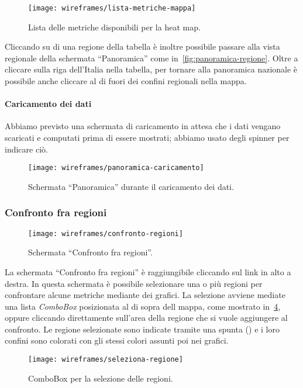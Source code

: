 \begin{figure}[H]
    \centering
    \texttt{[image: wireframes/lista-metriche-mappa]}
    \caption{Lista delle metriche disponibili per la heat map.}\label{fig:lista-metriche-mappa}
\end{figure}

Cliccando su di una regione della tabella è inoltre possibile passare alla vista regionale della schermata ``Panoramica'' come in~\ref{fig:panoramica-regione}. Oltre a cliccare sulla riga dell'Italia nella tabella, per tornare alla panoramica nazionale è possibile anche cliccare al di fuori dei confini regionali nella mappa.

\paragraph{Caricamento dei dati}
Abbiamo previsto una schermata di caricamento in attesa che i dati vengano scaricati e computati prima di essere mostrati; abbiamo usato degli spinner per indicare ciò.
\begin{figure}[H]
    \centering
    \texttt{[image: wireframes/panoramica-caricamento]}
    \caption{Schermata ``Panoramica'' durante il caricamento dei dati.}\label{fig:panoramica-caricamento}
\end{figure}


\subsubsection{Confronto fra regioni}\label{ss:confronto-fra-regioni}
\begin{figure}[H]
    \centering
    \texttt{[image: wireframes/confronto-regioni]}
    \caption{Schermata ``Confronto fra regioni''.}\label{fig:confronto-regioni}
\end{figure}
La schermata ``Confronto fra regioni'' è raggiungibile cliccando sul link in alto a destra. In questa schermata è possibile selezionare una o più regioni per confrontare alcune metriche mediante dei grafici. La selezione avviene mediate una lista \textit{ComboBox} posizionata al di sopra dell mappa, come mostrato in~\ref{fig:seleziona-regione}, oppure cliccando direttamente sull'area della regione che si vuole aggiungere al confronto. Le regione selezionate sono indicate tramite una spunta (\checkmark) e i loro confini sono colorati con gli stessi colori assunti poi nei grafici.

\begin{figure}[H]
    \centering
    \texttt{[image: wireframes/seleziona-regione]}
    \caption{ComboBox per la selezione delle regioni.}\label{fig:seleziona-regione}
\end{figure}

